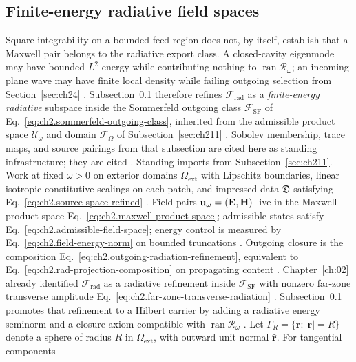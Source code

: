 \subsection{Finite-energy radiative field spaces}
\label{sec:ch311}
Square-integrability on a bounded feed region does not, by itself, establish that a Maxwell pair belongs to
the radiative export class. A closed-cavity eigenmode may have bounded \(L^{2}\) energy while contributing
nothing to \(\operatorname{ran}\mathcal{R}_\omega\); an incoming plane wave may have finite local density
while failing outgoing selection from Section~\ref{sec:ch24} \cite{stratton1941}. Subsection~\ref{sec:ch311}
therefore refines \(\mathcal{F}_{\mathrm{rad}}\) as a \emph{finite-energy radiative} subspace inside the
Sommerfeld outgoing class \(\mathcal{F}_{\mathrm{SF}}\) of Eq.~\eqref{eq:ch2.sommerfeld-outgoing-class},
inherited from the admissible product space \(\mathcal{U}_\omega\) and domain
\(\mathcal{F}_\Omega\) of Subsection~\ref{sec:ch211} \cite{stratton1941}. Sobolev
membership, trace maps, and source pairings from that subsection are cited here as standing infrastructure;
they are cited \cite{stratton1941}.
Standing imports from Subsection~\ref{sec:ch211}. Work at fixed \(\omega>0\) on exterior domains \(\Omega_{\mathrm{ext}}\) with Lipschitz boundaries,
linear isotropic constitutive scalings on each patch, and impressed data \(\mathfrak{D}\) satisfying
Eq.~\eqref{eq:ch2.source-space-refined} \cite{stratton1941}. Field pairs \(\mathbf{u}_\omega=(\mathbf{E},\mathbf{H})\)
live in the Maxwell product space Eq.~\eqref{eq:ch2.maxwell-product-space}; admissible states satisfy
Eq.~\eqref{eq:ch2.admissible-field-space}; energy control is measured by
Eq.~\eqref{eq:ch2.field-energy-norm} on bounded truncations \cite{stratton1941}. Outgoing
closure is the composition Eq.~\eqref{eq:ch2.outgoing-radiation-refinement}, equivalent to
Eq.~\eqref{eq:ch2.rad-projection-composition} on propagating content \cite{stratton1941}. Chapter~\ref{ch:02}
already identified \(\mathcal{F}_{\mathrm{rad}}\) as a radiative refinement inside
\(\mathcal{F}_{\mathrm{SF}}\) with nonzero far-zone transverse amplitude
Eq.~\eqref{eq:ch2.far-zone-transverse-radiation} \cite{stratton1941}. Subsection~\ref{sec:ch311}
promotes that refinement to a Hilbert carrier by adding a radiative energy seminorm and a closure axiom
compatible with \(\operatorname{ran}\mathcal{R}_\omega\) \cite{stratton1941}.
Let \(\Gamma_R=\{\mathbf{r}:|\mathbf{r}|=R\}\) denote a sphere of radius \(R\) in \(\Omega_{\mathrm{ext}}\),
with outward unit normal \(\hat{\mathbf{r}}\). For tangential components
